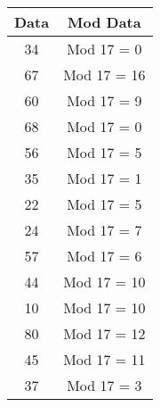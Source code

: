 \documentclass[12pt,a4paper]{article}
\begin{document}
\begin{enumerate}
\begin{multicols}{2}
      \begin{center}
        \begin{adjustbox}{scale=1,center}
          \begin{tabular}{ |c|c| } 
            \hline 
            Data & Mod Data  \\ \hline \hline 
            34 & Mod 17 = 0  \\ \hline
            67 & Mod 17 = 16 \\ \hline
            60 & Mod 17 = 9  \\ \hline
            68 & Mod 17 = 0  \\ \hline
            56 & Mod 17 = 5  \\ \hline
            35 & Mod 17 = 1  \\ \hline
            22 & Mod 17 = 5  \\ \hline
            24 & Mod 17 = 7  \\ \hline
            57 & Mod 17 = 6  \\ \hline
            44 & Mod 17 = 10 \\ \hline
            10 & Mod 17 = 10 \\ \hline
            80 & Mod 17 = 12 \\ \hline
            45 & Mod 17 = 11 \\ \hline
            37 & Mod 17 = 3  \\ \hline

          \end{tabular}
        \end{adjustbox}
      \end{center}

    \end{multicols}

\end{enumerate}
\end{document}
